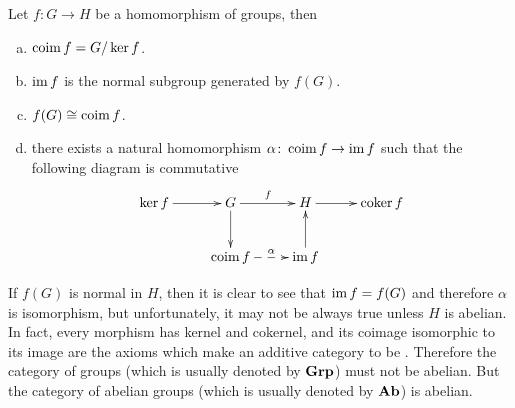 \begin{cor}
  Let $f\colon G\to H$ be a homomorphism of groups, then
  \begin{enumerate}[a)]
    \setlength{\itemindent}{2ex}
    \item $\operatorname{coim} f=G/\ker f$.
    \item $\operatorname{im} f$ is the normal subgroup generated by $f(G)$.
    \item $f(G) \cong \operatorname{coim} f$.
    \item there exists a natural homomorphism $\alpha\colon\operatorname{coim} f\to\operatorname{im} f$ such that the following diagram is commutative
   \begin{displaymath}
    \xymatrix{
     \ker f\ar[r]&G\ar[r]^{f}\ar[d]&H\ar[r]&\coker f\\
     &\coim f\ar@{-->}[r]^-{\alpha}&\im f\ar[u]&
    }
   \end{displaymath}
  \end{enumerate}
\end{cor}
\begin{rem}
  If $f(G)$ is normal in $H$, then it is clear to see that $\operatorname{im} f=f(G)$ and therefore $\alpha$ is isomorphism, but unfortunately, it may not be always true unless $H$ is abelian. In fact, every morphism has kernel and cokernel, and its coimage isomorphic to its image are the axioms which make an additive category to be . Therefore the category of groups (which is usually denoted by $\operatorname{\mathbf{Grp}}$) must not be abelian. But the category of abelian groups (which is usually denoted by $\operatorname{\mathbf{Ab}}$) is abelian.
\end{rem}
